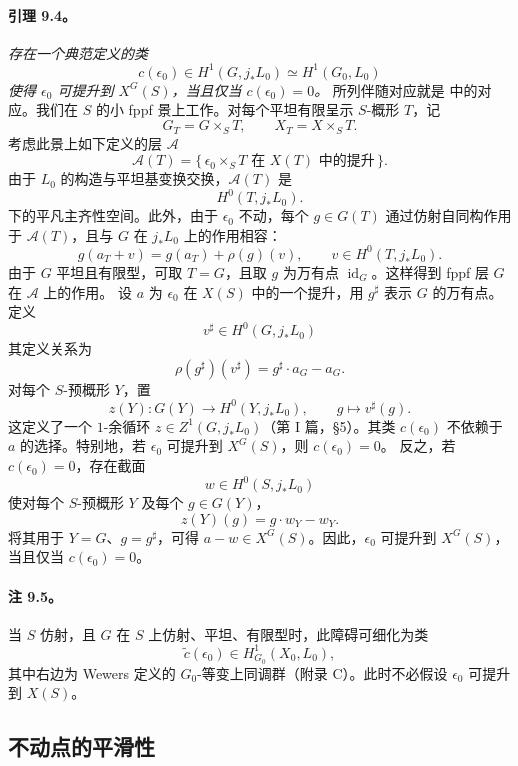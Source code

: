 \paragraph{\textbf{引理 9.4。}}
\emph{存在一个典范定义的类}
\[
  c(\epsilon_0)\in H^1(G,j_*L_0)
  \simeq H^1(G_0,L_0)
\]
\emph{使得 \(\epsilon_0\) 可提升到 \(X^G(S)\)，当且仅当 \(c(\epsilon_0)=0\)。}
所列伴随对应就是  中的对应。我们在 \(S\) 的小 fppf 景上工作。对每个平坦有限呈示 \(S\)-概形 \(T\)，记
\[
  G_T=G\times_S T,\qquad X_T=X\times_S T.
\]
考虑此景上如下定义的层 \(\mathcal A\)
\[
  \mathcal A(T)=
  \{\,\epsilon_0\times_S T\text{ 在 }X(T)\text{ 中的提升}\,\}.
\]
由于 \(L_0\) 的构造与平坦基变换交换，\(\mathcal A(T)\) 是
\[
  H^0(T,j_*L_0).
\]
下的平凡主齐性空间。此外，由于 \(\epsilon_0\) 不动，每个 \(g\in G(T)\) 通过仿射自同构作用于 \(\mathcal A(T)\)，且与 \(G\) 在 \(j_*L_0\) 上的作用相容：
\[
  g(a_T+v)=g(a_T)+\rho(g)(v),
  \qquad v\in H^0(T,j_*L_0).
\]
由于 \(G\) 平坦且有限型，可取 \(T=G\)，且取 \(g\) 为万有点 \(\operatorname{id}_G\)。这样得到 fppf 层 \(G\) 在 \(\mathcal A\) 上的作用。
设 \(a\) 为 \(\epsilon_0\) 在 \(X(S)\) 中的一个提升，用 \(g^\sharp\) 表示 \(G\) 的万有点。定义
\[
  v^\sharp\in H^0(G,j_*L_0)
\]
其定义关系为
\[
  \rho(g^\sharp)(v^\sharp)=g^\sharp\cdot a_G-a_G.
\]
对每个 \(S\)-预概形 \(Y\)，置
\[
  z(Y):G(Y)\longrightarrow H^0(Y,j_*L_0),
  \qquad g\longmapsto v^\sharp(g).
\]
这定义了一个 \(1\)-余循环 \(z\in Z^1(G,j_*L_0)\)（第 I 篇，\S5）。其类 \(c(\epsilon_0)\) 不依赖于 \(a\) 的选择。特别地，若 \(\epsilon_0\) 可提升到 \(X^G(S)\)，则 \(c(\epsilon_0)=0\)。
反之，若 \(c(\epsilon_0)=0\)，存在截面
\[
  w\in H^0(S,j_*L_0)
\]
使对每个 \(S\)-预概形 \(Y\) 及每个 \(g\in G(Y)\)，
\[
  z(Y)(g)=g\cdot w_Y-w_Y.
\]
将其用于 \(Y=G\)、\(g=g^\sharp\)，可得 \(a-w\in X^G(S)\)。因此，\(\epsilon_0\) 可提升到 \(X^G(S)\)，当且仅当 \(c(\epsilon_0)=0\)。
\paragraph{\textbf{注 9.5。}}
当 \(S\) 仿射，且 \(G\) 在 \(S\) 上仿射、平坦、有限型时，此障碍可细化为类
\[
  \widetilde c(\epsilon_0)\in H^1_{G_0}(X_0,L_0),
\]
其中右边为 Wewers 定义的 \(G_0\)-等变上同调群（附录 C）。此时不必假设 \(\epsilon_0\) 可提升到 \(X(S)\)。
\setcounter{subsection}{5}
\subsection{不动点的平滑性}
